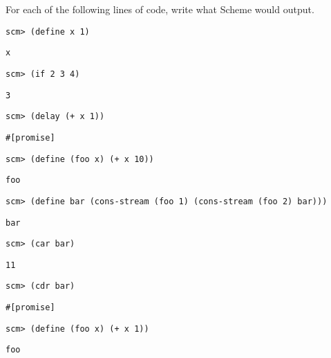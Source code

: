 \question For each of the following lines of code, write what Scheme would
output.

\begin{lstlisting}
scm> (define x 1)
\end{lstlisting}
\begin{solution}[.25in]
\texttt{x}
\end{solution}

\begin{lstlisting}
scm> (if 2 3 4)
\end{lstlisting}
\begin{solution}[.25in]
\texttt{3}
\end{solution}

\begin{lstlisting}
scm> (delay (+ x 1))
\end{lstlisting}
\begin{solution}[.25in]
\begin{lstlisting}
#[promise]
\end{lstlisting}
\end{solution}

\begin{lstlisting}
scm> (define (foo x) (+ x 10))
\end{lstlisting}
\begin{solution}[.25in]
\texttt{foo}
\end{solution}

\begin{lstlisting}
scm> (define bar (cons-stream (foo 1) (cons-stream (foo 2) bar)))
\end{lstlisting}
\begin{solution}[.25in]
\texttt{bar}
\end{solution}

\begin{lstlisting}
scm> (car bar)
\end{lstlisting}
\begin{solution}[.25in]
\texttt{11}
\end{solution}

\begin{lstlisting}
scm> (cdr bar)
\end{lstlisting}
\begin{solution}[.25in]
\begin{lstlisting}
#[promise]
\end{lstlisting}
\end{solution}

\begin{lstlisting}
scm> (define (foo x) (+ x 1))
\end{lstlisting}
\begin{solution}[.25in]
\texttt{foo}
\end{solution}

